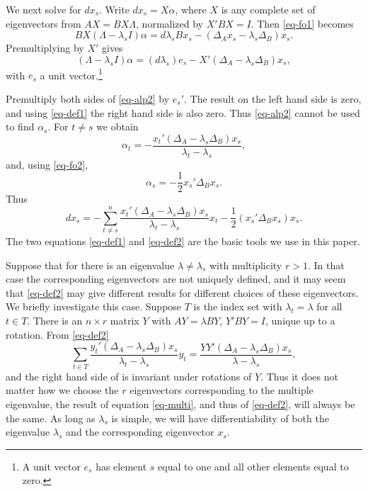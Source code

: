 \documentclass[
  12pt,
  letterpaper,
  DIV=11,
  numbers=noendperiod]{scrartcl}
\begin{document}
We next solve for \(dx_s\). Write \(dx_s=X\alpha\), where \(X\) is any
complete set of eigenvectors from \(AX=BX\Lambda\), normalized by
\(X'BX=I\). Then \eqref{eq-fo1} becomes \begin{equation}
BX(\Lambda-\lambda_sI)\alpha=d\lambda_s Bx_s-(\Delta_Ax_s-\lambda_s\Delta_B)x_s.\label{eq-alp1}
\end{equation} Premultiplying by \(X'\) gives \begin{equation}
(\Lambda-\lambda_sI)\alpha=(d\lambda_s)e_s-X'(\Delta_A-\lambda_s\Delta_B)x_s,\label{eq-alp2}
\end{equation} with \(e_s\) a unit
vector.\footnote{A unit vector $e_s$ has element $s$ equal to one and all other elements equal to zero.}

Premultiply both sides of \eqref{eq-alp2} by \(e_s'\). The result on the
left hand side is zero, and using \eqref{eq-def1} the right hand side is
also zero. Thus \eqref{eq-alp2} cannot be used to find \(\alpha_s\). For
\(t\not= s\) we obtain \begin{equation}
\alpha_t=-\frac{x_t'(\Delta_A-\lambda_s\Delta_B)x_s}{\lambda_t-\lambda_s},\label{eq-alp3}
\end{equation} and, using \eqref{eq-fo2}, \begin{equation}
\alpha_s=-\frac12x_s'\Delta_Bx_s.\label{eq-alp3}
\end{equation} Thus \begin{equation}
dx_s=-\sum_{t\not= s}^n\frac{x_t'(\Delta_A-\lambda_s\Delta_B)x_s}{\lambda_t-\lambda_s}x_t-\frac12(x_s'\Delta_Bx_s)x_s.\label{eq-def2}
\end{equation} The two equations \eqref{eq-def1} and \eqref{eq-def2} are
the basic tools we use in this paper.

Suppose that for there is an eigenvalue \(\lambda\not=\lambda_s\) with
multiplicity \(r>1\). In that case the corresponding eigenvectors are
not uniquely defined, and it may seem that \eqref{eq-def2} may give
different results for different choices of these eigenvectors. We
briefly investigate this case. Suppose \(T\) is the index set with
\(\lambda_t=\lambda\) for all \(t\in  T\). There is an \(n\times r\)
matrix \(Y\) with \(AY=\lambda BY\), \(Y'BY=I\), unique up to a
rotation. From \eqref{eq-def2} \begin{equation}
\sum_{t\in T}\frac{y_t'(\Delta_A-\lambda_s\Delta_B)x_s}{\lambda_t-\lambda_s}y_t=\frac{YY'(\Delta_A-\lambda_s\Delta_B)x_s}{\lambda-\lambda_s},\label{eq-multi}
\end{equation} and the right hand side of \label{eq-multi} is invariant
under rotations of \(Y\). Thus it does not matter how we choose the
\(r\) eigenvectors corresponding to the multiple eigenvalue, the result
of equation \eqref{eq-multi}, and thus of \eqref{eq-def2}, will always
be the same. As long as \(\lambda_s\) is simple, we will have
differentiability of both the eigenvalue \(\lambda_s\) and the
corresponding eigenvector \(x_s\).
\end{document}
